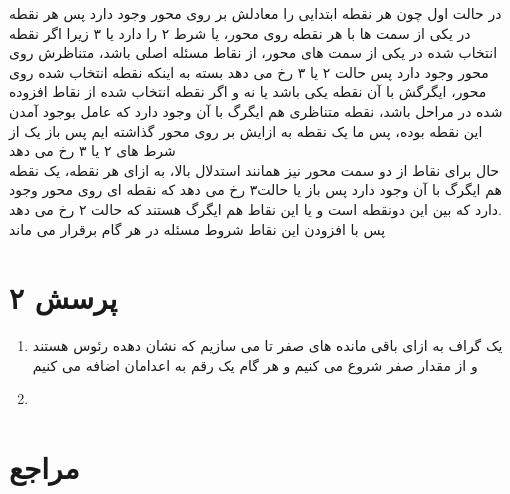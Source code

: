 \documentclass[a4paper]{article}
\begin{document}
در حالت اول چون هر نقطه ابتدایی را معادلش بر روی محور وجود دارد پس هر نقطه در یکی از سمت ها با هر نقطه روی محور، یا شرط ۲ را دارد یا ۳ زیرا اگر نقطه انتخاب شده در یکی از سمت های محور، از نقاط مسئله اصلی باشد، متناظرش روی محور وجود دارد پس حالت ۲ یا ۳ رخ می دهد بسته به اینکه نقطه انتخاب شده روی محور، ایگرگش با آن نقطه یکی باشد یا نه و اگر نقطه انتخاب شده از نقاط افزوده شده در مراحل باشد، نقطه متناظری هم ایگرگ با آن وجود دارد که عامل بوجود آمدن این نقطه بوده، پس ما یک نقطه به ازایش بر روی محور گذاشته ایم پس باز یک از شرط های ۲ یا ۳ رخ می دهد\\
حال برای نقاط از دو سمت محور نیز همانند استدلال بالا، به ازای هر نقطه، یک نقطه هم ایگرگ با آن وجود دارد پس باز یا حالت۳ رخ می دهد که نقطه ای روی محور وجود دارد که بین این دونقطه است و یا این نقاط هم ایگرگ هستند که حالت ۲ رخ می دهد.\\
پس با افزودن این نقاط شروط مسئله در هر گام برقرار می ماند

\pagebreak

\section*{پرسش ۲}
\begin{enumerate}
\item{}
یک گراف به ازای باقی مانده های صفر تا 
می سازیم که نشان دهده رئوس هستند و از مقدار صفر شروع می کنیم و هر گام یک رقم به اعدامان اضافه می کنیم
\item{}

\end{enumerate}


\pagebreak

\section*{مراجع}
\end{document}
